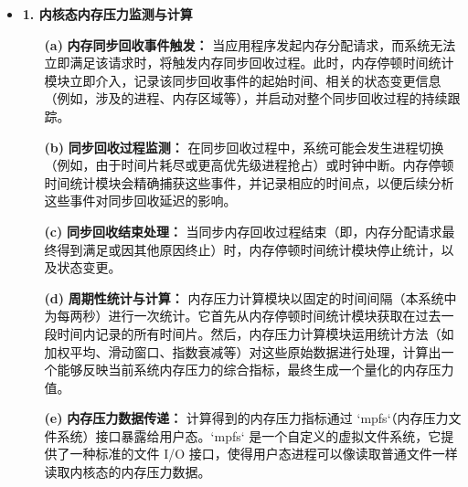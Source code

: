 \begin{itemize}
    \item \textbf{1. 内核态内存压力监测与计算}
    \begin{itemize}
        \item[\textbf{(a)}] \textbf{内存同步回收事件触发：} 当应用程序发起内存分配请求，而系统无法立即满足该请求时，将触发内存同步回收过程。此时，内存停顿时间统计模块立即介入，记录该同步回收事件的起始时间、相关的状态变更信息（例如，涉及的进程、内存区域等），并启动对整个同步回收过程的持续跟踪。
        \item[\textbf{(b)}] \textbf{同步回收过程监测：} 在同步回收过程中，系统可能会发生进程切换（例如，由于时间片耗尽或更高优先级进程抢占）或时钟中断。内存停顿时间统计模块会精确捕获这些事件，并记录相应的时间点，以便后续分析这些事件对同步回收延迟的影响。
        \item[\textbf{(c)}] \textbf{同步回收结束处理：} 当同步内存回收过程结束（即，内存分配请求最终得到满足或因其他原因终止）时，内存停顿时间统计模块停止统计，以及状态变更。
        \item[\textbf{(d)}] \textbf{周期性统计与计算：} 内存压力计算模块以固定的时间间隔（本系统中为每两秒）进行一次统计。它首先从内存停顿时间统计模块获取在过去一段时间内记录的所有时间片。然后，内存压力计算模块运用统计方法（如加权平均、滑动窗口、指数衰减等）对这些原始数据进行处理，计算出一个能够反映当前系统内存压力的综合指标，最终生成一个量化的内存压力值。
        \item[\textbf{(e)}] \textbf{内存压力数据传递：} 计算得到的内存压力指标通过 `mpfs`（内存压力文件系统）接口暴露给用户态。`mpfs` 是一个自定义的虚拟文件系统，它提供了一种标准的文件 I/O 接口，使得用户态进程可以像读取普通文件一样读取内核态的内存压力数据。
    \end{itemize}


\end{itemize}

